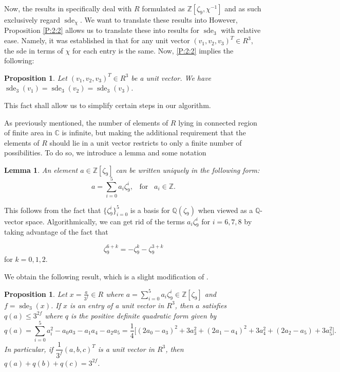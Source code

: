 \documentclass[12pt]{amsart}
\newtheorem{lemma}[theorem]{Lemma}
\newtheorem{proposition}[theorem]{Proposition}
\theoremstyle{definition}
\newcommand{\Z}{\mathbb{Z}}
\newcommand{\Q}{\mathbb{Q}}
\newcommand{\C}{\mathbb{C}}
\newcommand{\Zn}{\mathbb{Z}[\zeta_9]}
\newcommand{\Znc}{\mathbb{Z}[\zeta_9,\chi^{-1}]}
\DeclareMathOperator{\sde}{sde}
\begin{document}
	Now, the results in \cite{Kal} specifically deal with $R$ formulated as $\Znc$ and as such exclusively regard $\sde_\chi$. We want to translate these results into  However, Proposition \ref{P:2:2} allows us to translate these into results for $\sde_3$ with relative ease. Namely, it was established in \cite[Lemma 5.1]{Kal} that for any unit vector $(v_1, v_2, v_3)^T \in R^3$, the sde in terms of $\chi$ for each entry is the same. Now, \ref{P:2:2} implies the following:
	
	\begin{proposition}\label{P:2:3}
		Let $(v_1, v_2, v_3)^T \in R^3$ be a unit vector. We have $\sde_3(v_1) = \sde_3(v_2) = \sde_3(v_3)$.
	\end{proposition}
	
	This fact shall allow us to simplify certain steps in our algorithm.

	As previously mentioned, the number of elements of $R$ lying in connected region of finite area in $\C$ is infinite, but making the additional requirement that the elements of $R$ should lie in a unit vector restricts to only a finite number of possibilities. To do so, we introduce a lemma and some notation
	
	\begin{lemma}\label{L:2:1}
		An element $a \in \mathbb{Z}[\zeta_9]$ can be written uniquely in the following form:
		$$
		a = \sum_{i=0}^5 a_i \zeta_9^i, \;\;\; \mbox{for} \;\;\; a_i \in \Z.
		$$
	\end{lemma} 
	This follows from the fact that $\{\zeta_9^i\}_{i=0}^5$ is a basis for $\Q(\zeta_9)$ when viewed as a $\Q$-vector space. Algorithmically, we can get rid of the terms $a_i\zeta_9^i$ for $i=6,7,8$ by taking advantage of the fact that
	
	$$
	\zeta_9^{6+k} = -\zeta_9^{k} - \zeta_9^{3+k}
	$$
	for $k=0,1,2$.
	
	We obtain the following result, which is a slight modification of \cite[Theorem 4.3]{Kal}.
	
	\begin{proposition}\label{P:2:4}
		Let $x = \frac{a}{3^f} \in R$ where $a = \sum_{i=0}^5 a_i \zeta_9^i \in \Zn$ and $f = \sde_3(x)$. If $x$ is an entry of a unit vector in $R^3$, then $a$ satisfies $q(a) \leq 3^{2f}$ where $q$ is the positive definite quadratic form given by
		$$
			q(a) = \sum_{i=0}^5 a_i^2 - a_0a_3 - a_1a_4 - a_2a_5 = \frac{1}{4}\big[(2a_0 - a_3)^2 + 3a_3^2 + (2a_1 - a_4)^2 + 3a_4^2 + (2a_2 - a_5) + 3a_5^2\big].
		$$
		In particular, if $\dfrac{1}{3^f}(a,b,c)^T$ is a unit vector in $R^3$, then $q(a) + q(b) + q(c) = 3^{2f}$.
	\end{proposition}
	
\end{document}
